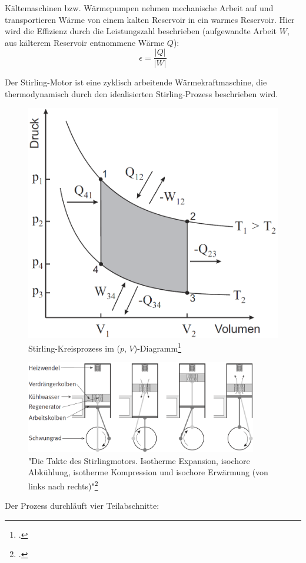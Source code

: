 Kältemaschinen bzw. Wärmepumpen nehmen mechanische Arbeit auf und transportieren Wärme von einem kalten Reservoir in ein warmes Reservoir. Hier wird die Effizienz durch die Leistungszahl beschrieben (aufgewandte Arbeit $W$, aus kälterem Reservoir entnommene Wärme $Q$):
\begin{equation}
	\epsilon=\frac{|Q|}{|W|}
\label{eq:leistungszahl}
\end{equation}

Der Stirling-Motor ist eine zyklisch arbeitende Wärmekraftmaschine, die thermodynamisch durch den idealisierten Stirling-Prozess beschrieben wird.
\begin{figure}[h]
  \centering
  \includegraphics[width=.7\textwidth]{res/stirling_pV}
  \caption{Stirling-Kreisprozess im ($p$, $V$)-Diagramm\footcite{anleitung-ss2015}}
  \label{fig:stirling_pV}
\end{figure}
\begin{figure}[h]
  \centering
  \includegraphics[width=0.9\textwidth]{res/stirling_aufbau}
  \caption{"Die Takte des Stirlingmotors. Isotherme Expansion, isochore Abkühlung, isotherme Kompression und isochore Erwärmung (von links nach rechts)"\footcite{anleitung-ss2015}}
  \label{fig:stirling_aufbau}
\end{figure}
Der Prozess durchläuft vier Teilabschnitte:

